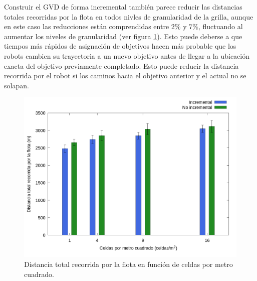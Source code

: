 

Construir el GVD de forma incremental también parece reducir las distancias
totales recorridas por la flota en todos nivles de granularidad de la grilla, aunque en este
caso las reducciones están comprendidas entre $2\%$ y $7\%$, fluctuando al
aumentar los niveles de granularidad (ver figura \ref{fig:gra:inc:ec}). Esto puede deberse a que tiempos más
rápidos de asignación de objetivos hacen más probable que los robots cambien su
trayectoria a un nuevo objetivo antes de llegar a la ubicación exacta del
objetivo previamente completado. Esto puede reducir la distancia recorrida por
el robot si los caminos hacia el objetivo anterior y el actual no se solapan.

\begin{figure}[H]
  \centerfloat
  \includegraphics[clip=true, width=\graphlen]{imagenes/graficas_chicas/graficas_histo_num/incrementalidad/exploration_cost.png}
  \caption{Distancia total recorrida por la flota  en función de celdas por metro cuadrado.}\label{fig:gra:inc:ec}
\end{figure}


